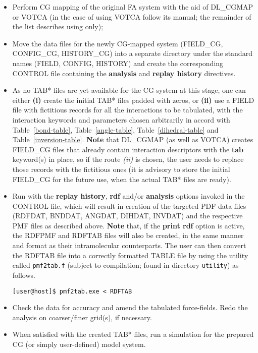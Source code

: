 \begin{itemize}
\item Perform CG mapping of the original FA system with the aid
of DL\_CGMAP or VOTCA (in the case of using VOTCA follow its manual;
the remainder of the list describes using \D only);
\item Move the data files for the newly CG-mapped system
(FIELD\_CG, CONFIG\_CG, HISTORY\_CG) into a separate directory
under the standard names (FIELD, CONFIG, HISTORY) and create
the corresponding CONTROL file containing the {\bf analysis}
and {\bf replay history} directives.
\item As no TAB* files are yet available for the CG system
at this stage, one can either {\bf (i)} create the initial TAB* files
padded with zeros, or {\bf (ii)} use a FIELD file with fictitious records
for all the interactions to be tabulated, with the interaction
keywords and parameters chosen arbitrarily in accord with
Table~\ref{bond-table}, Table~\ref{angle-table},
Table~\ref{dihedral-table} and Table~\ref{inversion-table}.
{\bf Note} that DL\_CGMAP (as well as VOTCA) creates FIELD\_CG files
that already contain interaction descriptors with the {\bf tab}
keyword(s) in place, so if the route {\em (ii)} is chosen,
the user needs to replace those records with the fictitious ones
(it is advisory to store the initial FIELD\_CG for the future
use, when the actual TAB* files are ready).
\item Run \D with the {\bf replay history}, {\bf rdf} and/or
{\bf analysis} options invoked in the CONTROL file, which
will result in creation of the targeted PDF data files (RDFDAT,
BNDDAT, ANGDAT, DIHDAT, INVDAT) and the respective PMF files
as described above. {\bf Note} that, if the {\bf print rdf}
option is active, the RDFPMF and RDFTAB files will also be
created, in the same manner and format as their intramolecular
counterparts. The user can then convert the RDFTAB file into
a correctly formatted TABLE file by using the utility called
{\tt pmf2tab.f} (subject to compilation; found in \D directory
{\tt utility}) as follows.


\begin{verbatim}
[user@host]$ pmf2tab.exe < RDFTAB
\end{verbatim}

\item Check the data for accuracy and amend the tabulated
force-fields. Redo the analysis on coarser/finer grid(s),
if necessary.

\item When satisfied with the created TAB* files, run
a \D simulation for the prepared CG (or simply user-defined)
model system.
\end{itemize}
